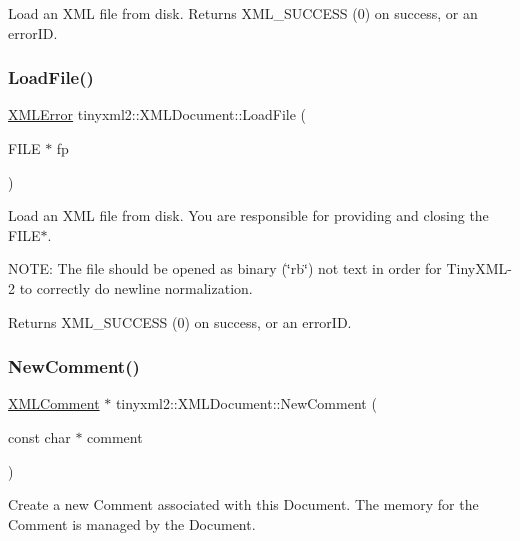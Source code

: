 Load an X\+ML file from disk. Returns X\+M\+L\+\_\+\+S\+U\+C\+C\+E\+SS (0) on success, or an error\+ID. \mbox{\label{classtinyxml2_1_1_x_m_l_document_a5f1d330fad44c52f3d265338dd2a6dc2}} 
\subsubsection{\texorpdfstring{Load\+File()}{LoadFile()}\hspace{0.1cm}{\footnotesize\ttfamily [2/2]}}
{\footnotesize\ttfamily \hyperlink{namespacetinyxml2_a1fbf88509c3ac88c09117b1947414e08}{X\+M\+L\+Error} tinyxml2\+::\+X\+M\+L\+Document\+::\+Load\+File (\begin{DoxyParamCaption}\item[{F\+I\+LE $\ast$}]{fp }\end{DoxyParamCaption})}

Load an X\+ML file from disk. You are responsible for providing and closing the F\+I\+L\+E$\ast$.

N\+O\+TE\+: The file should be opened as binary (\char`\"{}rb\char`\"{}) not text in order for Tiny\+X\+M\+L-\/2 to correctly do newline normalization.

Returns X\+M\+L\+\_\+\+S\+U\+C\+C\+E\+SS (0) on success, or an error\+ID. \mbox{\label{classtinyxml2_1_1_x_m_l_document_a386df0befd06aadb5e0cd21381aa955a}} 
\subsubsection{\texorpdfstring{New\+Comment()}{NewComment()}}
{\footnotesize\ttfamily \hyperlink{classtinyxml2_1_1_x_m_l_comment}{X\+M\+L\+Comment} $\ast$ tinyxml2\+::\+X\+M\+L\+Document\+::\+New\+Comment (\begin{DoxyParamCaption}\item[{const char $\ast$}]{comment }\end{DoxyParamCaption})}

Create a new Comment associated with this Document. The memory for the Comment is managed by the Document. \mbox{\label{classtinyxml2_1_1_x_m_l_document_ae519030c0262fa2daff8993681990e16}} 
